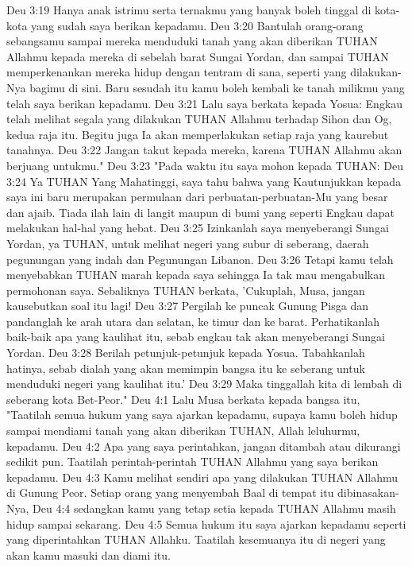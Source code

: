 Deu 3:19  Hanya anak istrimu serta ternakmu yang banyak boleh tinggal di kota-kota yang sudah saya berikan kepadamu.
Deu 3:20  Bantulah orang-orang sebangsamu sampai mereka menduduki tanah yang akan diberikan TUHAN Allahmu kepada mereka di sebelah barat Sungai Yordan, dan sampai TUHAN memperkenankan mereka hidup dengan tentram di sana, seperti yang dilakukan-Nya bagimu di sini. Baru sesudah itu kamu boleh kembali ke tanah milikmu yang telah saya berikan kepadamu.
Deu 3:21  Lalu saya berkata kepada Yosua: Engkau telah melihat segala yang dilakukan TUHAN Allahmu terhadap Sihon dan Og, kedua raja itu. Begitu juga Ia akan memperlakukan setiap raja yang kaurebut tanahnya.
Deu 3:22  Jangan takut kepada mereka, karena TUHAN Allahmu akan berjuang untukmu."
Deu 3:23  "Pada waktu itu saya mohon kepada TUHAN:
Deu 3:24  Ya TUHAN Yang Mahatinggi, saya tahu bahwa yang Kautunjukkan kepada saya ini baru merupakan permulaan dari perbuatan-perbuatan-Mu yang besar dan ajaib. Tiada ilah lain di langit maupun di bumi yang seperti Engkau dapat melakukan hal-hal yang hebat.
Deu 3:25  Izinkanlah saya menyeberangi Sungai Yordan, ya TUHAN, untuk melihat negeri yang subur di seberang, daerah pegunungan yang indah dan Pegunungan Libanon.
Deu 3:26  Tetapi kamu telah menyebabkan TUHAN marah kepada saya sehingga Ia tak mau mengabulkan permohonan saya. Sebaliknya TUHAN berkata, 'Cukuplah, Musa, jangan kausebutkan soal itu lagi!
Deu 3:27  Pergilah ke puncak Gunung Pisga dan pandanglah ke arah utara dan selatan, ke timur dan ke barat. Perhatikanlah baik-baik apa yang kaulihat itu, sebab engkau tak akan menyeberangi Sungai Yordan.
Deu 3:28  Berilah petunjuk-petunjuk kepada Yosua. Tabahkanlah hatinya, sebab dialah yang akan memimpin bangsa itu ke seberang untuk menduduki negeri yang kaulihat itu.'
Deu 3:29  Maka tinggallah kita di lembah di seberang kota Bet-Peor."
Deu 4:1  Lalu Musa berkata kepada bangsa itu, "Taatilah semua hukum yang saya ajarkan kepadamu, supaya kamu boleh hidup sampai mendiami tanah yang akan diberikan TUHAN, Allah leluhurmu, kepadamu.
Deu 4:2  Apa yang saya perintahkan, jangan ditambah atau dikurangi sedikit pun. Taatilah perintah-perintah TUHAN Allahmu yang saya berikan kepadamu.
Deu 4:3  Kamu melihat sendiri apa yang dilakukan TUHAN Allahmu di Gunung Peor. Setiap orang yang menyembah Baal di tempat itu dibinasakan-Nya,
Deu 4:4  sedangkan kamu yang tetap setia kepada TUHAN Allahmu masih hidup sampai sekarang.
Deu 4:5  Semua hukum itu saya ajarkan kepadamu seperti yang diperintahkan TUHAN Allahku. Taatilah kesemuanya itu di negeri yang akan kamu masuki dan diami itu.

